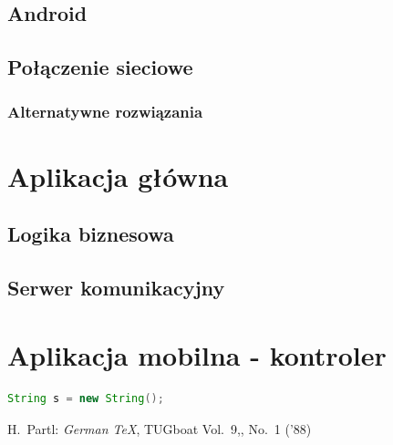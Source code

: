 \documentclass[12pt]{article}
\begin{document}
\subsection{Android}

\subsection{Połączenie sieciowe}

\subsubsection{Alternatywne rozwiązania}


\section{Aplikacja główna}
\subsection{Logika biznesowa}
\subsection{Serwer komunikacyjny}
\section{Aplikacja mobilna - kontroler}


\begin{lstlisting}[language=Java]
String s = new String();
\end{lstlisting}

 
\newpage
\thispagestyle{empty}
 
  
\listoffigures
 
\listoftables
\begin{thebibliography}{99}
 H.~Partl:
\emph{German \TeX},
TUGboat Vol.~9,, No.~1 ('88)
\end{thebibliography}
\end{document}
